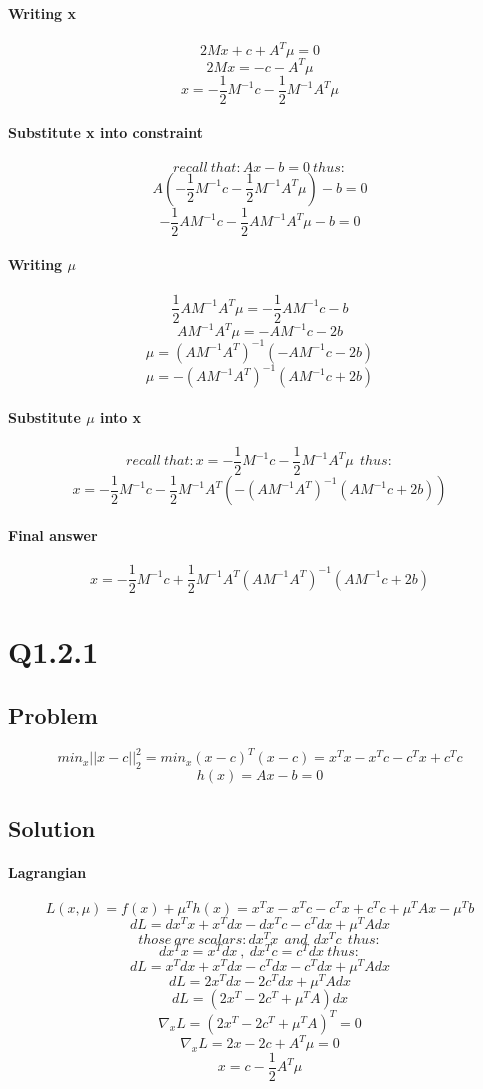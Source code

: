 \documentclass[12pt]{article}
\begin{document}
\paragraph{Writing x}
\[2Mx + c + A^T \mu = 0 \]
\[2Mx = - c - A^T \mu\]
\[x = - \frac{1}{2} M^{-1}c - \frac{1}{2} M^{-1}A^T \mu\]
\paragraph{Substitute x into constraint}
\[recall\  that: Ax - b = 0\ thus:\]
\[A(- \frac{1}{2} M^{-1}c - \frac{1}{2} M^{-1}A^T \mu) - b = 0 \]
\[- \frac{1}{2} AM^{-1}c - \frac{1}{2} AM^{-1}A^T \mu - b = 0 \]
\paragraph{Writing $\mu$}
\[\frac{1}{2} AM^{-1}A^T \mu = - \frac{1}{2} AM^{-1}c - b \]
\[AM^{-1}A^T \mu = - AM^{-1}c - 2b \]
\[ \mu = (AM^{-1}A^T)^{-1}(- AM^{-1}c - 2b)\]
\[ \mu = -(AM^{-1}A^T)^{-1}(AM^{-1}c + 2b)\]
\paragraph{Substitute $\mu$ into x}
\[recall\  that: x = - \frac{1}{2} M^{-1}c - \frac{1}{2} M^{-1}A^T \mu \ \ thus:\]
\[x = - \frac{1}{2} M^{-1}c - \frac{1}{2} M^{-1}A^T (-(AM^{-1}A^T)^{-1}(AM^{-1}c + 2b))\]
\paragraph{Final answer}
\[x = - \frac{1}{2} M^{-1}c + \frac{1}{2} M^{-1}A^T (AM^{-1}A^T)^{-1}(AM^{-1}c + 2b)\]

\newpage
\section{Q1.2.1}
\subsection{Problem}
\[min_x ||x-c||_2 ^2 = min_x (x-c)^T (x-c) = x^T x - x^T c - c^T x + c^T c\]
\[h(x)= Ax -b = 0 \]
\subsection{Solution}
\paragraph{Lagrangian}
\[L(x,\mu)=f(x) + \mu ^T h(x) = x^T x - x^T c - c^T x + c^T c + \mu ^T Ax - \mu ^T b\]
\[dL = dx^T x + x^T dx - dx^T c - c^T dx + \mu ^T Adx \]
\[those \ are \ scalars: dx^T x \ \ and \ \ dx^T c \ \ thus: \]
\[dx^T x = x^T dx \ , \ dx^T c = c^T dx \ thus: \]
\[dL = x^T dx + x^T dx - c^T dx - c^T dx + \mu ^T Adx \]
\[dL = 2x^T dx - 2c^T dx + \mu ^T Adx \]
\[dL = (2x^T - 2c^T + \mu ^T A)dx \]
\[\nabla_x L = (2x^T - 2c^T + \mu ^T A)^T = 0 \]
\[\nabla_x L = 2x - 2c + A^T \mu = 0 \]
\[x= c - \frac{1}{2} A^T \mu \]
\end{document}
